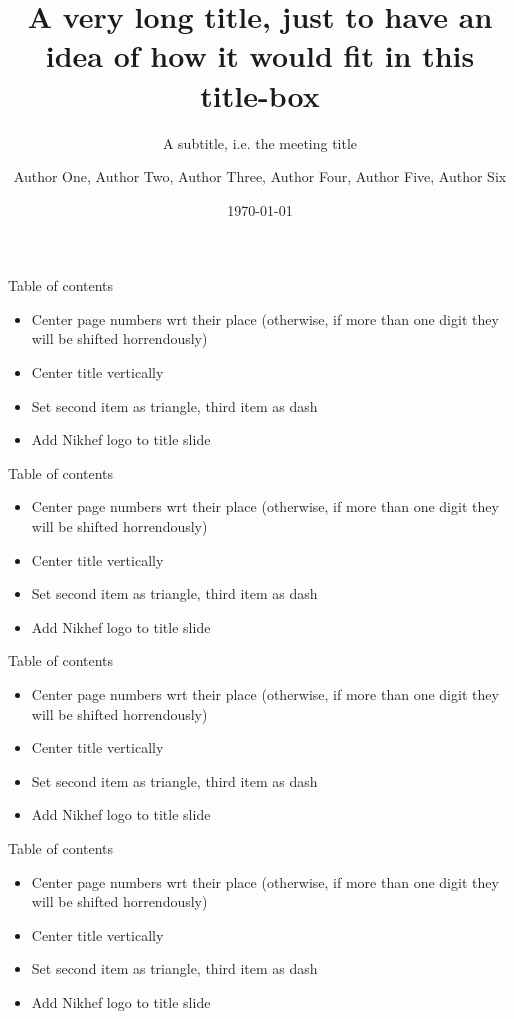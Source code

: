 \documentclass{beamer}
\author{Author One, Author Two, Author Three, Author Four, Author Five, Author Six}
\title{A very long title, just to have an idea of how it would fit in this title-box}
\subtitle{A subtitle, i.e. the meeting title}
\institute{example University}
\date{\today}
\begin{document}
\frame{\maketitle}

\begin{frame}{Table of contents}
	\begin{itemize}
		\item Center page numbers wrt their place (otherwise, if more than one digit they will be shifted horrendously)
		\item Center title vertically
		\item Set second item as triangle, third item as dash
		\item Add Nikhef logo to title slide
	\end{itemize}
\end{frame}

\begin{frame}{Table of contents}
	\begin{itemize}
		\item Center page numbers wrt their place (otherwise, if more than one digit they will be shifted horrendously)
		\item Center title vertically
		\item Set second item as triangle, third item as dash
		\item Add Nikhef logo to title slide
	\end{itemize}
\end{frame}

\begin{frame}{Table of contents}
	\begin{itemize}
		\item Center page numbers wrt their place (otherwise, if more than one digit they will be shifted horrendously)
		\item Center title vertically
		\item Set second item as triangle, third item as dash
		\item Add Nikhef logo to title slide
	\end{itemize}
\end{frame}

\begin{frame}{Table of contents}
	\begin{itemize}
		\item Center page numbers wrt their place (otherwise, if more than one digit they will be shifted horrendously)
		\item Center title vertically
		\item Set second item as triangle, third item as dash
		\item Add Nikhef logo to title slide
	\end{itemize}
\end{frame}
\end{document}
